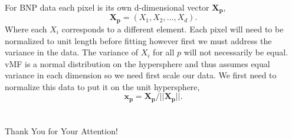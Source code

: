 \documentclass[
]{beamer}
\begin{document}
\begin{frame}
For BNP data each pixel is its own d-dimensional vector $\boldsymbol{X_p}$, 
$$\boldsymbol{X_p} = (X_1, X_2, ..., X_d).$$
Where each $X_i$ corresponds to a different element. Each pixel will need to be normalized to unit length before fitting however first we must address the variance in the data.  The variance of $X_i$ for all $p$ will not necessarily be equal. vMF is a normal distribution on the hypersphere and thus assumes equal variance in each dimension so we need first scale our data. We first need to normalize this data to put it on the unit hypersphere,
$$ \boldsymbol{x_p} = \boldsymbol{X_p}/||\boldsymbol{X_p}||.$$

\end{frame}
\section{\bibname}
\begin{frame}[t, allowframebreaks]{\bibname}
\printbibliography[heading=none]
\end{frame}

\begin{frame}[plain]
\vfill
\centerline{Thank You for Your Attention!}
\vfill\vfill
\end{frame}
\end{document}
